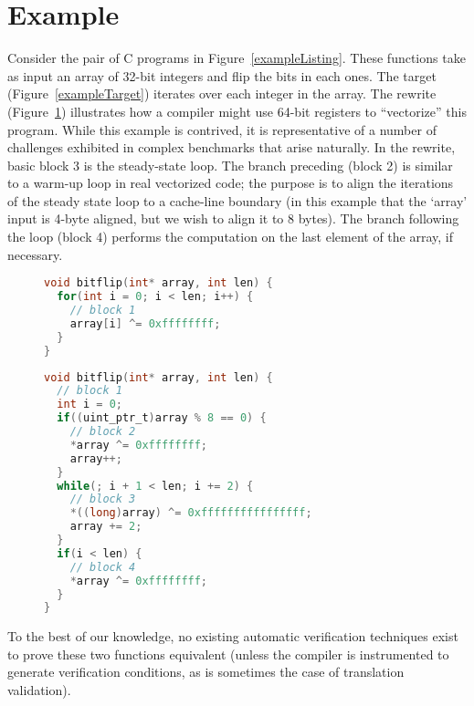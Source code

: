 \section{Example}\label{example-sec}

Consider the pair of C programs in Figure~\ref{exampleListing}. These
functions take as input an array of 32-bit integers and flip the bits
in each ones. The target (Figure~\ref{exampleTarget}) iterates over
each integer in the array. The rewrite (Figure~\ref{exampleRewrite})
illustrates how a compiler might use 64-bit registers to ``vectorize''
this program. While this example is contrived, it is representative
of a number of challenges exhibited in complex benchmarks that arise
naturally. In the rewrite, basic block 3 is the steady-state loop.
The branch preceding (block 2) is similar to a warm-up loop in real
vectorized code; the purpose is to align the iterations of the steady
state loop to a cache-line boundary (in this example that the `array'
input is 4-byte aligned, but we wish to align it to 8 bytes). The
branch following the loop (block 4) performs the computation on the
last element of the array, if necessary.

\begin{figure}\label{exampleListing}
\begin{lstlisting}[language=C]
void bitflip(int* array, int len) {
  for(int i = 0; i < len; i++) {
    // block 1
    array[i] ^= 0xffffffff;
  }
}
\end{lstlisting}
\label{exampleTarget}
\begin{lstlisting}[language=C]
void bitflip(int* array, int len) {
  // block 1
  int i = 0;
  if((uint_ptr_t)array % 8 == 0) {
    // block 2
    *array ^= 0xffffffff;
    array++;
  } 
  while(; i + 1 < len; i += 2) {
    // block 3
    *((long)array) ^= 0xffffffffffffffff;
    array += 2;
  }
  if(i < len) {
    // block 4
    *array ^= 0xffffffff;
  }
}
\end{lstlisting}
\label{exampleRewrite}
\end{figure}

To the best of our knowledge, no existing automatic verification
techniques exist to prove these two functions equivalent (unless the
compiler is instrumented to generate verification conditions, as is
sometimes the case of translation validation).

